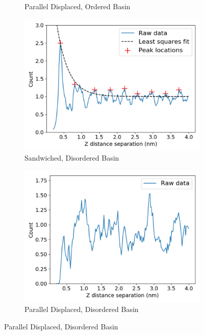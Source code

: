 \documentclass[journal=jpcbfk,manuscript=article]{achemso}
\begin{document}
\begin{figure}[!htb]
\begin{subfigure}{0.45\textwidth}
  \caption{Parallel Displaced, Ordered Basin}\label{fig:z_correlation_offset}
  \end{subfigure}  
  \begin{subfigure}{0.45\textwidth}
  \centering
  \includegraphics[width=\textwidth]{z_correlation_sandwich_disordered.pdf}
  \caption{Sandwiched, Disordered Basin}\label{fig:z_correlation_sandwich_disordered}
  \end{subfigure}  
  \begin{subfigure}{0.45\textwidth}
  \centering
  \includegraphics[width=\textwidth]{z_correlation_offset_disordered.pdf}
  \caption{Parallel Displaced, Disordered Basin}\label{fig:z_correlation_offset_disordered}
  \end{subfigure}  

\end{figure}
\end{document}
